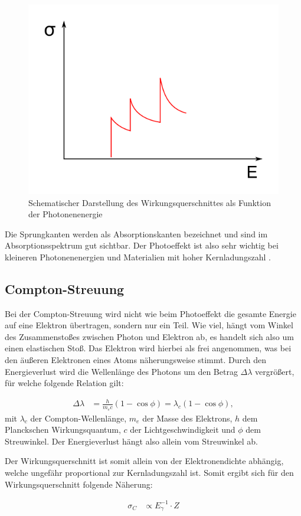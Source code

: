 \documentclass[
	parskip=half,10pt,
	numbers= noenddot, %
	toc=flat, %
	oneside,
	twocolumn,
	]{scrartcl}
\begin{document}
\begin{figure}[h]
\centering
\includegraphics[width=.4\textwidth]{images/kante.png}
\caption{Schematischer Darstellung des Wirkungsquerschnittes als Funktion der Photonenenergie \cite{wikipedia}}
\label{fig:absorption}
\end{figure}

Die Sprungkanten werden als Absorptionskanten bezeichnet und sind im Absorptionsspektrum gut sichtbar. Der Photoeffekt ist also sehr wichtig bei kleineren Photonenenergien 
und Materialien mit hoher Kernladungszahl \cite{schatz}.

\subsection{Compton-Streuung}

Bei der Compton-Streuung wird nicht wie beim Photoeffekt die gesamte Energie auf eine Elektron übertragen, sondern nur ein Teil. Wie viel, hängt vom Winkel des 
Zusammenstoßes zwischen Photon und Elektron ab, es handelt sich also um einen elastischen Stoß. Das Elektron wird hierbei als frei angenommen, was bei den 
äußeren Elektronen eines Atoms näherungsweise stimmt. Durch den Energieverlust wird die Wellenlänge des Photons um den Betrag $\Delta \lambda$ vergrößert, für 
welche folgende Relation gilt:

\begin{align}
\Delta \lambda &= \frac{h}{m_e c} (1 - \cos \phi) = \lambda_c (1 - \cos \phi),
\end{align}
mit $\lambda_c$ der Compton-Wellenlänge, $m_e$ der Masse des Elektrons, $h$ dem Planckschen Wirkungsquantum, $c$ der Lichtgeschwindigkeit und $\phi$ dem Streuwinkel. 
Der Energieverlust hängt also allein vom Streuwinkel ab. 

Der Wirkungsquerschnitt ist somit allein von der Elektronendichte abhängig, welche ungefähr proportional zur Kernladungszahl ist. Somit ergibt sich für 
den Wirkungsquerschnitt folgende Näherung: 

\begin{align}
\sigma_C &\propto E_{\gamma}^{-1} \cdot Z
\end{align}
\end{document}
